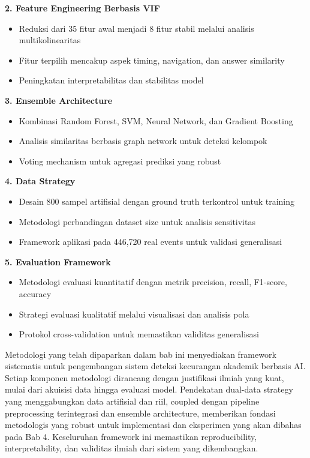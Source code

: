 \textbf{2. Feature Engineering Berbasis VIF}
\begin{itemize}
    \item Reduksi dari 35 fitur awal menjadi 8 fitur stabil melalui analisis multikolinearitas
    \item Fitur terpilih mencakup aspek timing, navigation, dan answer similarity
    \item Peningkatan interpretabilitas dan stabilitas model
\end{itemize}

\textbf{3. Ensemble Architecture}
\begin{itemize}
    \item Kombinasi Random Forest, SVM, Neural Network, dan Gradient Boosting
    \item Analisis similaritas berbasis graph network untuk deteksi kelompok
    \item Voting mechanism untuk agregasi prediksi yang robust
\end{itemize}

\textbf{4. Data Strategy}
\begin{itemize}
    \item Desain 800 sampel artifisial dengan ground truth terkontrol untuk training
    \item Metodologi perbandingan dataset size untuk analisis sensitivitas
    \item Framework aplikasi pada 446,720 real events untuk validasi generalisasi
\end{itemize}

\textbf{5. Evaluation Framework}
\begin{itemize}
    \item Metodologi evaluasi kuantitatif dengan metrik precision, recall, F1-score, accuracy
    \item Strategi evaluasi kualitatif melalui visualisasi dan analisis pola
    \item Protokol cross-validation untuk memastikan validitas generalisasi
\end{itemize}

Metodologi yang telah dipaparkan dalam bab ini menyediakan framework sistematis untuk pengembangan sistem deteksi kecurangan akademik berbasis AI. Setiap komponen metodologi dirancang dengan justifikasi ilmiah yang kuat, mulai dari akuisisi data hingga evaluasi model. Pendekatan dual-data strategy yang menggabungkan data artifisial dan riil, coupled dengan pipeline preprocessing terintegrasi dan ensemble architecture, memberikan fondasi metodologis yang robust untuk implementasi dan eksperimen yang akan dibahas pada Bab 4. Keseluruhan framework ini memastikan reproducibility, interpretability, dan validitas ilmiah dari sistem yang dikembangkan.
